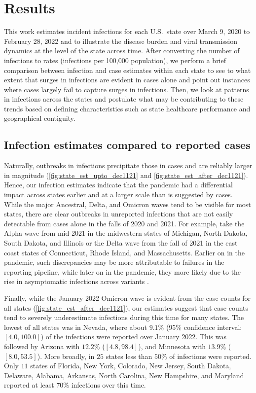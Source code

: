 \documentclass{article}
\begin{document}
\section{Results}

This work estimates incident infections for each U.S.\ state over March 9,
2020 to February 28, 2022 and to illustrate the disease burden and viral
transmission dynamics at the level of the state across time. After converting the number
of infections to rates (infections per 100,000 population), we perform a
brief comparison between infection and case estimates within each state to see
to what extent that surges in infections are evident in cases alone
and point out instances where cases largely fail to capture surges in infections.
Then, we look at patterns in infections across the states and postulate what may be 
contributing to these trends based on defining characteristics such as state 
healthcare performance and geographical contiguity. 

\subsection{Infection estimates compared to reported cases}

Naturally, outbreaks in infections precipitate those in cases and are reliably larger in
magnitude (\autoref{fig:state_est_upto_dec1121} and
\autoref{fig:state_est_after_dec1121}).
Hence, our infection estimates indicate
that the pandemic had a differential impact across states earlier and at a larger scale
than is suggested by cases. While the major Ancestral, Delta, and Omicron waves tend to be
visible for most states, there are
clear outbreaks in unreported infections that are not easily detectable from cases alone in the 
falls of 2020 and 2021. For example, take the Alpha wave from mid-2021 in the 
midwestern states of Michigan, North Dakota, South Dakota, and Illinois
or the Delta wave from the fall of 2021 in the east coast states 
of Connecticut, Rhode Island, and Massachusetts. Earlier on in the pandemic, such
discrepancies may be more attributable to failures in the reporting pipeline, while
later on in the pandemic, they more likely due to the rise in asymptomatic infections
across variants \citep{oph2022covid, garrett2022high}. 

Finally, while the January 2022 Omicron wave is evident from the case counts for all states 
(\autoref{fig:state_est_after_dec1121}), our estimates suggest that case counts tend to severely 
underestimate infections during this time for many states. The lowest of all states was in Nevada, 
where about $9.1\%$ (95\% confidence interval: $[4.0, 100.0]$) of the infections were reported 
over January 2022. This was followed by Arizona with $12.2\%$ ($[4.8, 98.4]$), and Minnesota 
with $13.9\%$  ($[8.0, 53.5]$).  More broadly, in $25$ states
less than $50\%$ of infections were reported. Only $11$ states of Florida, New York, Colorado, New Jersey, 
South Dakota, Delaware, Alabama, Arkansas, North Carolina, New Hampshire, 
and Maryland reported at least $70\%$ infections over this time. 
\end{document}
